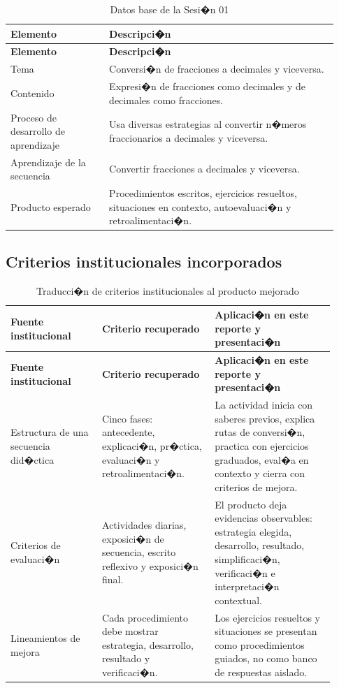 \documentclass[
	spanish,
	letterpaper, oneside
]{article}
\begin{document}
\begin{longtable}{@{}p{0.28\linewidth}p{0.65\linewidth}@{}}
	\caption{Datos base de la Sesi�n 01}\label{tab:datos-sesion}\\
	\toprule
	\textbf{Elemento} & \textbf{Descripci�n} \\
	\midrule
	\endfirsthead
	\toprule
	\textbf{Elemento} & \textbf{Descripci�n} \\
	\midrule
	\endhead
	Tema & Conversi�n de fracciones a decimales y viceversa. \\
	Contenido & Expresi�n de fracciones como decimales y de decimales como fracciones. \\
	Proceso de desarrollo de aprendizaje & Usa diversas estrategias al convertir n�meros fraccionarios a decimales y viceversa. \\
	Aprendizaje de la secuencia & Convertir fracciones a decimales y viceversa. \\
	Producto esperado & Procedimientos escritos, ejercicios resueltos, situaciones en contexto, autoevaluaci�n y retroalimentaci�n. \\
	\bottomrule
\end{longtable}

\subsection{Criterios institucionales incorporados}

\begin{longtable}{@{}p{0.26\linewidth}p{0.32\linewidth}p{0.34\linewidth}@{}}
	\caption{Traducci�n de criterios institucionales al producto mejorado}\label{tab:criterios-institucionales-s01}\\
	\toprule
	\textbf{Fuente institucional} & \textbf{Criterio recuperado} & \textbf{Aplicaci�n en este reporte y presentaci�n} \\
	\midrule
	\endfirsthead
	\toprule
	\textbf{Fuente institucional} & \textbf{Criterio recuperado} & \textbf{Aplicaci�n en este reporte y presentaci�n} \\
	\midrule
	\endhead
	Estructura de una secuencia did�ctica & Cinco fases: antecedente, explicaci�n, pr�ctica, evaluaci�n y retroalimentaci�n. & La actividad inicia con saberes previos, explica rutas de conversi�n, practica con ejercicios graduados, eval�a en contexto y cierra con criterios de mejora. \\
	Criterios de evaluaci�n & Actividades diarias, exposici�n de secuencia, escrito reflexivo y exposici�n final. & El producto deja evidencias observables: estrategia elegida, desarrollo, resultado, simplificaci�n, verificaci�n e interpretaci�n contextual. \\
	Lineamientos de mejora & Cada procedimiento debe mostrar estrategia, desarrollo, resultado y verificaci�n. & Los ejercicios resueltos y situaciones se presentan como procedimientos guiados, no como banco de respuestas aislado. \\
	\bottomrule
\end{longtable}
\end{document}
